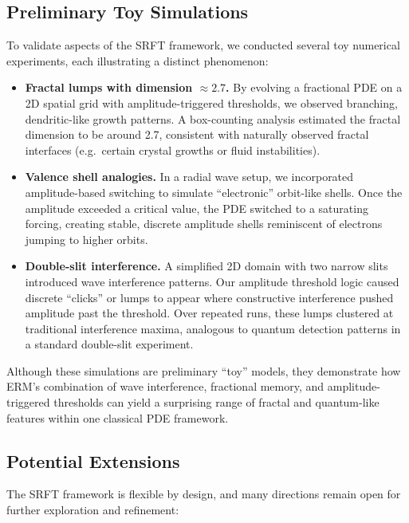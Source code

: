 \documentclass[12pt]{article}
\begin{document}
\subsection{Preliminary Toy Simulations}

To validate aspects of the SRFT framework, we conducted several toy numerical
experiments, each illustrating a distinct phenomenon:

\begin{itemize}
    \item \textbf{Fractal lumps with dimension \(\approx 2.7\).}
    By evolving a fractional PDE on a 2D spatial grid with amplitude-triggered
    thresholds, we observed branching, dendritic-like growth patterns. A
    box-counting analysis estimated the fractal dimension to be around 2.7,
    consistent with naturally observed fractal interfaces (e.g.\ certain crystal
    growths or fluid instabilities).

    \item \textbf{Valence shell analogies.}
    In a radial wave setup, we incorporated amplitude-based switching to
    simulate “electronic” orbit-like shells. Once the amplitude exceeded
    a critical value, the PDE switched to a saturating forcing, creating
    stable, discrete amplitude shells reminiscent of electrons jumping
    to higher orbits.

    \item \textbf{Double-slit interference.}
    A simplified 2D domain with two narrow slits introduced wave interference
    patterns. Our amplitude threshold logic caused discrete “clicks” or lumps
    to appear where constructive interference pushed amplitude past the
    threshold. Over repeated runs, these lumps clustered at traditional
    interference maxima, analogous to quantum detection patterns in a
    standard double-slit experiment.
\end{itemize}

Although these simulations are preliminary “toy” models, they demonstrate
how ERM’s combination of wave interference, fractional memory, and
amplitude-triggered thresholds can yield a surprising range of fractal
and quantum-like features within one classical PDE framework.


\subsection{Potential Extensions}
\label{subsec:potential_extensions}

The SRFT framework is flexible by design, and many directions remain open for
further exploration and refinement:
\end{document}
